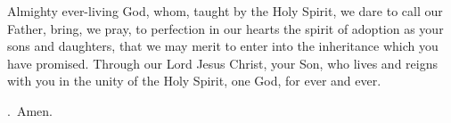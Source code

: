 \lettrine[lines=3]{A}{}lmighty ever-living God,
whom, taught by the Holy Spirit,
we dare to call our Father,
bring, we pray, to perfection in our hearts
the spirit of adoption as your sons and daughters,
that we may merit to enter into the inheritance
which you have promised.
Through our Lord Jesus Christ, your Son,
who lives and reigns with you in the unity of the Holy Spirit,
one God, for ever and ever. \par \Rbar.~Amen.
